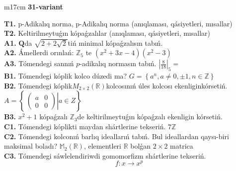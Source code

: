 \documentclass{article}
\begin{document}
\begin{tabular}{m{17cm}}
\textbf{31-variant}
\newline

\textbf{T1.} p-Adikalıq norma, p-Adikalıq norma (anıqlaması, qásiyetleri, mısallar) \\
\textbf{T2.} Keltirilmeytuǵın kópaǵzalılar (anıqlaması, qásiyetleri, mısallar) \\
\textbf{A1.} \(\mathbf{Q}\)da \(\sqrt{2 + 2\sqrt{2}}\)tiń minimal kópaǵzalısın tabıń. \\
\textbf{A2.} Ámellerdi orınlań: \(\mathbb{Z}_{5}\) te \(\left( x^{2} + 3x - 4 \right)\left( x^{2} - 3 \right)\) \\
\textbf{A3.} Tómendegi sannıń \(p\)-adikalıq normasın tabıń. \(|\frac{8}{18}|_{5} =\) \\
\textbf{B1.} Tómendegi kóplik kolco dúzedi ma? \(G = \left\{ a^{n},a \neq 0, \pm 1,n \in \mathbb{Z} \right\}\) \\
\textbf{B2.} Tómendegi kóplik\(M_{2 \times 2}\left( \mathbb{R} \right)\)kolcosınıń úles kolcosı ekenliginkórsetiń. \(A = \left\{ \left. \ \begin{pmatrix}
a & 0 \\
0 & 0
\end{pmatrix} \right|a \in Z \right\}\) \\
\textbf{B3.} \(x^{2} + 1\) kópaǵzalı \(\mathbb{Z}_{3}\)de keltirilmeytuǵın kópaǵzalı ekenligin kórsetiń. \\
\textbf{C1.} Tómendegi kóplikti maydan shártlerine tekseriń. \(7\mathbb{Z}\) \\
\textbf{C2.} Tómendegi kolconıń barlıq ideallarıń tabıń. Bul ideallardan qaysı-biri maksimal boladı? \(\mathbb{M}_{2}\left( \mathbb{R} \right)\), elementleri \(\mathbb{R}\) bolǵan \(2 \times 2\) matrica \\
\textbf{C3.} Tómendegi sáwlelendiriwdi gomomorfizm shártlerine tekseriń.
\[f:x \rightarrow x^{p}\] \\

\end{tabular}
\vspace{1cm}
\end{document}
